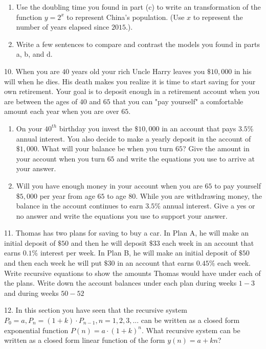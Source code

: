 \documentclass[10pt,]{book}
\theoremstyle{plain}
\theoremstyle{definition}
\theoremstyle{definition}
\theoremstyle{definition}
\numberwithin{equation}{section}
\begin{document}
\begin{exerciselist}
\begin{enumerate}[label=(\alph*)]
\item\hypertarget{li-61}{}Use the doubling time you found in part (c) to write an transformation of the function \(y=2^x\) to represent China's population. (Use \(x\) to represent the number of years elapsed since \(2015\).).%
\item\hypertarget{li-62}{}Write a few sentences to compare and contrast the models you found in parts a, b, and d.%
\end{enumerate}
%
\par\smallskip
\item[10.]\hypertarget{exercise-29}{}\hypertarget{p-134}{}%
When you are \(40\) years old your rich Uncle Harry leaves you \(\$10,000\) in his will when he dies.  His death makes you realize it is time to start saving for your own retirement. Your goal is to deposit enough in a retirement account when you are between the ages of \(40\) and \(65\) that you can "pay yourself" a comfortable amount each year when you are over \(65\). \leavevmode%
\begin{enumerate}[label=(\alph*)]
\item\hypertarget{li-63}{}On your \(40^{th}\) birthday you invest the \(\$10,000\) in an account that pays \(3.5\%\) annual interest.  You also decide to make a yearly deposit in the account of \(\$1,000\). What will your balance be when you turn \(65\)?  Give the amount in your account when you turn \(65\) and write the equations you use to arrive at your answer.%
\item\hypertarget{li-64}{}Will you have enough money in your account when you are \(65\) to pay yourself \(\$5,000\) per year from age \(65\) to age \(80\).  While you are withdrawing money, the balance in the account continues to earn \(3.5\%\) annual interest.  Give a yes or no answer and write the equations you use to support your answer.%
\end{enumerate}
%
\par\smallskip
\item[11.]\hypertarget{exercise-30}{}\hypertarget{p-135}{}%
Thomas has two plans for saving to buy a car.  In Plan A, he will make an initial deposit of \(\$50\) and then he will deposit \(\$33\) each week in an account that earns \(0.1\%\) interest per week.  In Plan B, he will make an initial deposit of \(\$50\) and then each week he will put \(\$30\) in an account that earns \(0.45\%\) each week. Write recursive equations to show the amounts Thomas would have under each of the plans. Write down the account balances under each plan during weeks \(1 - 3\) and during weeks \(50 - 52\)%
\par\smallskip
\item[12.]\hypertarget{exercise-31}{}\hypertarget{p-136}{}%
In this section you have seen that the recursive system \(P_0=a, P_n=(1+k) \cdot P_{n-1}, n = 1, 2, 3, ...\) can be written as a closed form exponential function \(P(n)=a \cdot (1+k)^n\). What recursive system can be written as a closed form linear function of the form \(y(n)=a+kn\)?%
\par\smallskip
\end{exerciselist}
\end{document}
